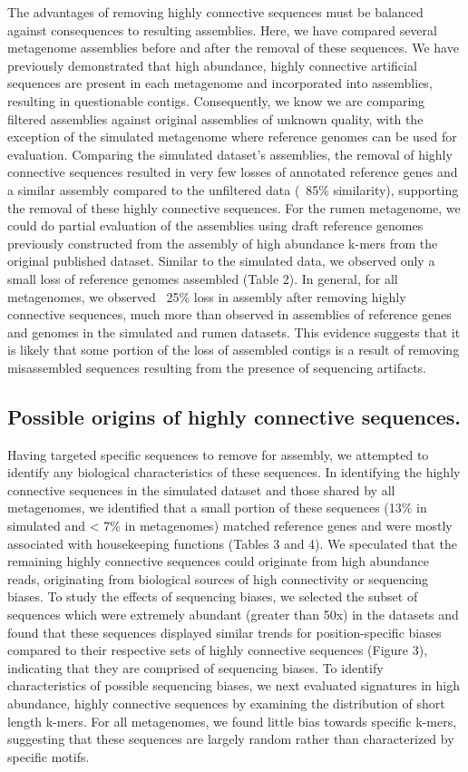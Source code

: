 \documentclass[11pt]{article} %
\begin{document}
The advantages of removing highly connective sequences must be balanced against consequences to resulting assemblies.  Here, we have compared several metagenome assemblies before and after the removal of these sequences.  We have previously demonstrated that high abundance, highly connective artificial sequences are present in each metagenome and incorporated into assemblies, resulting in questionable contigs.  Consequently, we know we are comparing filtered assemblies against original assemblies of unknown quality, with the exception of the simulated metagenome where reference genomes can be used for evaluation.  Comparing the simulated dataset's assemblies, the removal of highly connective sequences resulted in very few losses of annotated reference genes and a similar assembly compared to the unfiltered data (~85\% similarity), supporting the removal of these highly connective sequences.  For the rumen metagenome, we could do partial evaluation of the assemblies using draft reference genomes previously constructed from the assembly of high abundance k-mers from the original published dataset.  Similar to the simulated data, we observed only a small loss of reference genomes assembled (Table 2).  In general, for all metagenomes, we observed ~25\% loss in assembly after removing highly connective sequences, much more than observed in assemblies of reference genes and genomes in the simulated and rumen datasets.  This evidence suggests that it is likely that some portion of the loss of assembled contigs is a result of removing misassembled sequences resulting from the presence of sequencing artifacts.

\subsection{Possible origins of highly connective sequences.}

Having targeted specific sequences to remove for assembly, we attempted to identify any biological characteristics of these sequences.  In identifying the highly connective sequences in the simulated dataset and those shared by all metagenomes, we identified that a small portion of these sequences (13\% in simulated and < 7\% in metagenomes) matched reference genes and were mostly associated with housekeeping functions (Tables 3 and 4).   We speculated that the remaining highly connective sequences could originate from high abundance reads, originating from biological sources of high connectivity or sequencing biases.  To study the effects of sequencing biases, we selected the subset of sequences which were extremely abundant (greater than 50x) in the datasets and found that these sequences displayed similar trends for position-specific biases compared to their respective sets of highly connective sequences (Figure 3), indicating that they are comprised of sequencing biases.  To identify characteristics of possible sequencing biases, we next evaluated signatures in high abundance, highly connective sequences by examining the distribution of short length k-mers.  For all metagenomes, we found little bias towards specific k-mers, suggesting that these sequences are largely random rather than characterized by specific motifs. 
\end{document}
